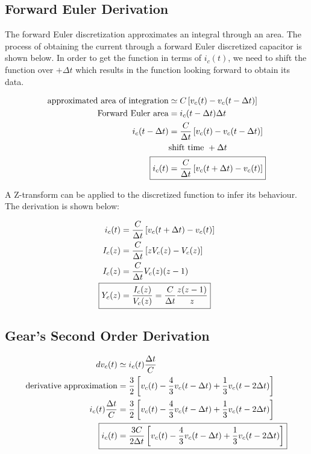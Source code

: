 \documentclass[10pt, oneside, letterpaper]{article}
\begin{document}
\subsection{Forward Euler Derivation}

The forward Euler discretization approximates an integral through an area. The process of obtaining the current through a forward Euler discretized capacitor is shown below. In order to get the function in terms of $i_c(t)$, we need to shift the function over $+\Delta{}t$ which results in the function looking forward to obtain its data.

\begin{alignat}{2}
  \text{approximated area of integration} &\simeq C\left[v_c(t)-v_c(t-\Delta{}t)\right] \\
  \text{Forward Euler area} &= i_c(t-\Delta{}t)\Delta{}t \\
  i_c(t-\Delta{}t) &= \frac{C}{\Delta{}t}\left[v_c(t)-v_c(t-\Delta{}t)\right] \\
  & \text{shift time }+\Delta{}t \\
  \Aboxed{i_c(t) &= \frac{C}{\Delta{}t}\left[v_c(t+\Delta{}t)-v_c(t)\right]}
\end{alignat}

A Z-transform can be applied to the discretized function to infer its behaviour. The derivation is shown below:

\begin{alignat}{2}
  i_c(t) &= \frac{C}{\Delta{}t}\left[v_c(t+\Delta{}t)-v_c(t)\right] \\
  I_c(z) &= \frac{C}{\Delta{}t}\left[zV_c(z) - V_c(z)\right] \\
  I_c(z) &= \frac{C}{\Delta{}t}V_c(z)(z - 1) \\
  \Aboxed{Y_c(z) &= \frac{I_c(z)}{V_c(z)} = \frac{C}{\Delta{}t}\frac{z(z - 1)}{z}}
\end{alignat}

\subsection{Gear's Second Order Derivation}

\begin{alignat}{2}
  dv_c(t) &\simeq i_c(t)\frac{\Delta{}t}{C} \\
  \text{derivative approximation} &= \frac{3}{2}\left[v_c(t) - \frac{4}{3}v_c(t-\Delta{}t) + \frac{1}{3}v_c(t-2\Delta{}t)\right] \\
  i_c(t)\frac{\Delta{}t}{C} &= \frac{3}{2}\left[v_c(t) - \frac{4}{3}v_c(t-\Delta{}t) + \frac{1}{3}v_c(t-2\Delta{}t)\right] \\
  \Aboxed{i_c(t) &= \frac{3C}{2\Delta{}t}\left[v_c(t) - \frac{4}{3}v_c(t-\Delta{}t) + \frac{1}{3}v_c(t-2\Delta{}t)\right]}
\end{alignat}
\end{document}
